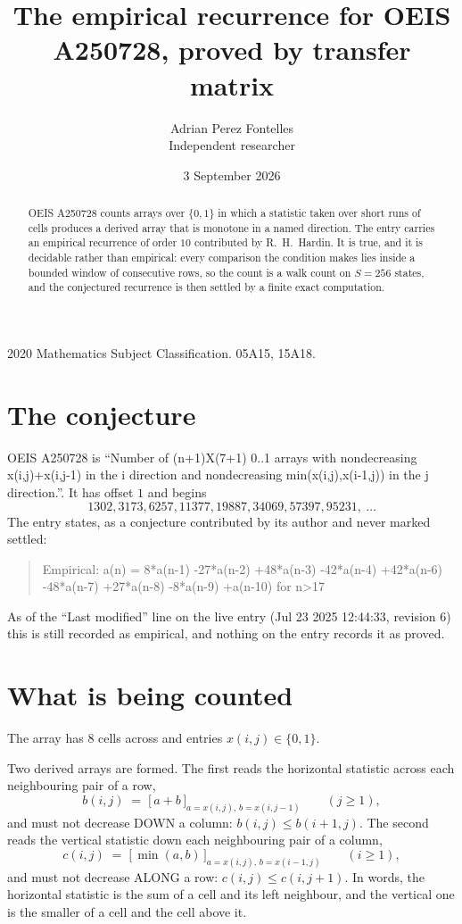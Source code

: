 \documentclass[11pt,a4paper]{article}
\title{The empirical recurrence for OEIS A250728, proved by transfer matrix}
\author{Adrian Perez Fontelles\\ \small Independent researcher}
\date{3 September 2026}
\theoremstyle{plain}
\theoremstyle{definition}
\begin{document}
\maketitle

\begin{abstract}
OEIS A250728 counts arrays over $\{0,1\}$ in which a statistic taken over short runs
of cells produces a derived array that is monotone in a named direction. The entry carries an
empirical recurrence of order $10$ contributed by R.~H.~Hardin. It is true, and it is
decidable rather than empirical: every comparison the condition makes lies inside a bounded
window of consecutive rows, so the count is a walk count on $S=256$ states, and the
conjectured recurrence is then settled by a finite exact computation.
\end{abstract}

\noindent\small 2020 Mathematics Subject Classification. 05A15, 15A18.\normalsize

\section{The conjecture}

OEIS A250728 is ``Number of (n+1)X(7+1) 0..1 arrays with nondecreasing x(i,j)+x(i,j-1) in the i direction and nondecreasing min(x(i,j),x(i-1,j)) in the j direction.''. It has offset $1$ and begins
\[
1302, 3173, 6257, 11377, 19887, 34069, 57397, 95231,\ \dots
\]
The entry states, as a conjecture contributed by its author and never marked settled:
\begin{quote}
Empirical: a(n) = 8*a(n-1) -27*a(n-2) +48*a(n-3) -42*a(n-4) +42*a(n-6) -48*a(n-7) +27*a(n-8) -8*a(n-9) +a(n-10) for n>17
\end{quote}
As of the ``Last modified'' line on the live entry (Jul 23 2025 12:44:33, revision 6) this is still
recorded as empirical, and nothing on the entry records it as proved.

\section{What is being counted}

The array has $8$ cells across and entries $x(i,j)\in\{0,1\}$.

Two derived arrays are formed. The first reads the horizontal statistic across each
neighbouring pair of a row,
\[
b(i,j)\;=\;\bigl[\,a+b\,\bigr]_{a=x(i,j),\,b=x(i,j-1)}\qquad (j\ge1),
\]
and must not decrease DOWN a column: $b(i,j)\le b(i{+}1,j)$. The second reads the vertical
statistic down each neighbouring pair of a column,
\[
c(i,j)\;=\;\bigl[\,\min(a,b)\,\bigr]_{a=x(i,j),\,b=x(i{-}1,j)}\qquad (i\ge1),
\]
and must not decrease ALONG a row: $c(i,j)\le c(i,j{+}1)$. In words, the horizontal statistic
is the sum of a cell and its left neighbour, and the vertical one is
the smaller of a cell and the cell above it.
\end{document}
